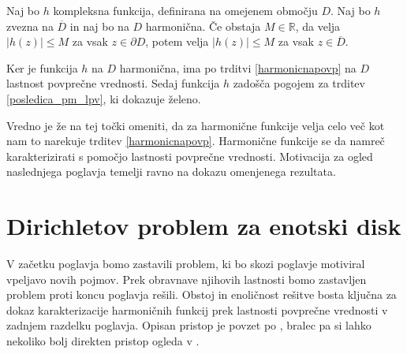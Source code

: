 \documentclass[mat1, tisk]{fmfdelo}
\begin{document}
    \begin{posledica}
        Naj bo $h$ kompleksna funkcija, definirana na omejenem območju $D$. Naj bo $h$ zvezna na $\overline{D}$ in naj bo na $D$ harmonična. 
        Če obstaja $M \in \mathbb{R}$, da velja $|h(z)| \leq M$ za vsak $z \in \partial D$, potem velja $|h(z)| \leq M$ za vsak $z \in \overline{D}$. 
    \end{posledica}
    \begin{dokaz}
        Ker je funkcija $h$ na $D$ harmonična, ima po trditvi \ref{harmonicnapovp} na $D$ lastnost povprečne vrednosti. Sedaj funkcija $h$ zadošča pogojem za trditev \ref{posledica_pm_lpv}, ki dokazuje želeno.
    \end{dokaz}

    Vredno je že na tej točki omeniti, da za harmonične funkcije velja celo več kot nam to narekuje trditev \ref{harmonicnapovp}. 
    Harmonične funkcije se da namreč karakterizirati s pomočjo lastnosti povprečne vrednosti. 
    Motivacija za ogled naslednjega poglavja temelji ravno na dokazu omenjenega rezultata. 

\section{Dirichletov problem za enotski disk}

V začetku poglavja bomo zastavili problem, ki bo skozi poglavje motiviral vpeljavo novih pojmov. 
Prek obravnave njihovih lastnosti bomo zastavljen problem proti koncu poglavja rešili. 
Obstoj in enoličnost rešitve bosta ključna za dokaz karakterizacije harmoničnih funkcij prek lastnosti povprečne vrednosti v zadnjem razdelku poglavja.
Opisan pristop je povzet po \cite[poglavje 10.1.]{gamelin}, bralec pa si lahko nekoliko bolj direkten pristop ogleda v \cite[stran 3 in 4]{garrett}.
\end{document}
